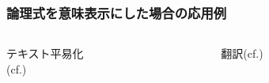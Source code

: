 \documentclass[dvipdfmx]{beamer}
\begin{document}
\begin{frame}
\frametitle{論理式を意味表示にした場合の応用例}

\begin{columns}[t]
    \begin{column}{0.5\textwidth} %
      \begin{center}
        テキスト平易化\\(cf.\cite{plain_text})\\
        \begin{figure}[h]
                \label{fig:application1}
        \end{figure}
      \end{center}
    \end{column}
    \begin{column}{0.5\textwidth} %
      \begin{center}
        翻訳(cf.\cite{neuralAMR})\\
        \begin{figure}[h]
                \label{fig:application2}
        \end{figure}
      \end{center}

    \end{column}
\end{columns}

\end{frame}



\end{document}
